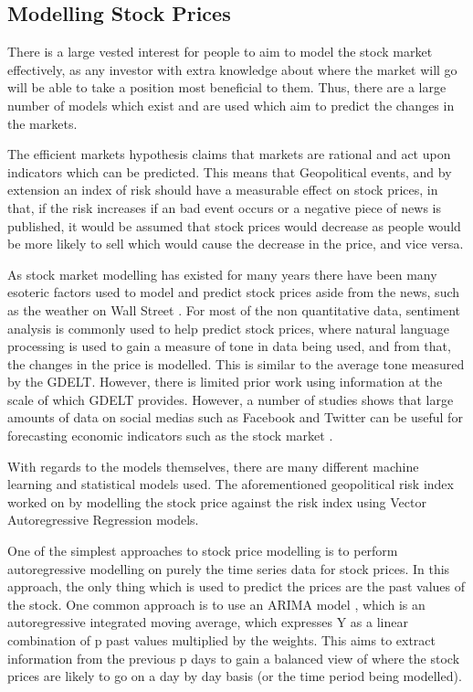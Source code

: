 \subsection{Modelling Stock Prices}
There is a large vested interest for people to aim to model the stock market effectively, as any investor with extra knowledge about where the market will go will be able to take a position most beneficial to them. Thus, there are a large number of models which exist and are used which aim to predict the changes in the markets. 

The efficient markets hypothesis claims that markets are rational and act upon indicators which can be predicted. This means that Geopolitical events, and by extension an index of risk should have a measurable effect on stock prices, in that, if the risk increases if an bad event occurs or a negative piece of news is published, it would be assumed that stock prices would decrease as people would be more likely to sell which would cause the decrease in the price, and vice versa.

As stock market modelling has existed for many years there have been many esoteric factors used to model and predict stock prices aside from the news, such as the weather on Wall Street \cite{saunders1993stock}. For most of the non quantitative data, sentiment analysis is commonly used to help predict stock prices, where natural language processing is used to gain a measure of tone in data being used, and from that, the changes in the price is modelled. This is similar to the average tone measured by the GDELT. However, there is limited prior work using information at the scale of which GDELT provides. However, a number of studies shows that large amounts of data on social medias such as Facebook and Twitter can be useful for forecasting economic indicators such as the stock market \cite{bollen2011twitter} \cite{arias2014forecasting}. 

With regards to the models themselves, there are many different machine learning and statistical models used. The aforementioned geopolitical risk index worked on by modelling the stock price against the risk index using Vector Autoregressive Regression models. 

One of the simplest approaches to stock price modelling is to perform autoregressive modelling on purely the time series data for stock prices. In this approach, the only thing which is used to predict the prices are the past values of the stock. One common approach is to use an ARIMA model \cite{ariyo2014stock}, which is an autoregressive integrated moving average, which expresses Y as a linear combination of p past values multiplied by the weights. This aims to extract information from the previous p days to gain a balanced view of where the stock prices are likely to go on a day by day basis (or the time period being modelled).  

